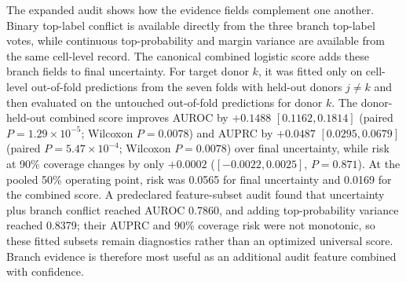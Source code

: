 \documentclass[10pt]{article}
\begin{document}
\begin{table}[H]
\centering
\caption{Expanded error-audit scores. Results are donor-level means with 95\% confidence intervals after averaging seeds within each donor. Risk-at-50\% rows are pooled operating points from the risk--coverage artifact and are shown without a donor-level interval. Binary top-label conflict is a discrete function of the three branch top labels; top-probability variance and margin variance are continuous branch-derived scores available from the same cell-level audit artifact. The canonical direct rows are read from the v46 cell-level audit artifact without fitting. The displayed two- and three-feature rows are predeclared target-donor-held-out logistic feature subsets; they are diagnostics and are not the canonical four-feature estimate. For each target donor, the canonical combined logistic score is fitted on out-of-fold predictions from the seven non-held-out donor folds using final uncertainty, branch conflict, top-probability variance and margin variance, then evaluated on the target held-out donor. The 0.0563 and 0.0565 values refer to final uncertainty and the combined score at 90\% coverage, respectively; the 50\% operating points are shown separately.}
\label{tab:continuous-branch-audit}
\scriptsize
\setlength{\tabcolsep}{2.4pt}
\resizebox{\textwidth}{!}{%

}
\end{table}

The expanded audit shows how the evidence fields complement one another. Binary top-label conflict is available directly from the three branch top-label votes, while continuous top-probability and margin variance are available from the same cell-level record. The canonical combined logistic score adds these branch fields to final uncertainty. For target donor $k$, it was fitted only on cell-level out-of-fold predictions from the seven folds with held-out donors $j\ne k$ and then evaluated on the untouched out-of-fold predictions for donor $k$. The donor-held-out combined score improves AUROC by $+0.1488$ $[0.1162,0.1814]$ (paired $P=1.29\times10^{-5}$; Wilcoxon $P=0.0078$) and AUPRC by $+0.0487$ $[0.0295,0.0679]$ (paired $P=5.47\times10^{-4}$; Wilcoxon $P=0.0078$) over final uncertainty, while risk at 90\% coverage changes by only $+0.0002$ ($[-0.0022,0.0025]$, $P=0.871$). At the pooled 50\% operating point, risk was 0.0565 for final uncertainty and 0.0169 for the combined score. A predeclared feature-subset audit found that uncertainty plus branch conflict reached AUROC 0.7860, and adding top-probability variance reached 0.8379; their AUPRC and 90\% coverage risk were not monotonic, so these fitted subsets remain diagnostics rather than an optimized universal score. Branch evidence is therefore most useful as an additional audit feature combined with confidence.
\end{document}

